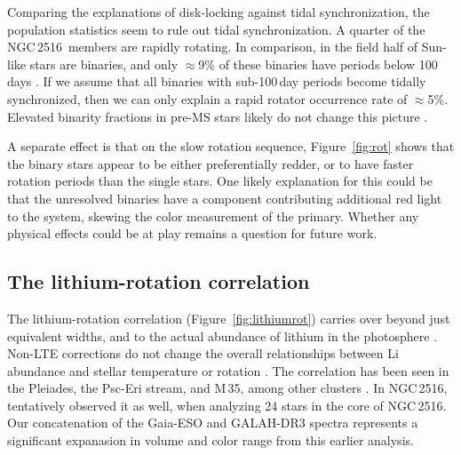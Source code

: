 \documentclass[12pt,twocolumn,tighten]{aastex63}
\newcommand{\cn}{NGC\,2516} %
\begin{document}
Comparing the explanations of disk-locking against tidal
synchronization, the population statistics seem to rule out 
tidal synchronization.  A quarter of the \cn\ members
are rapidly rotating.  In comparison, in the field half of Sun-like
stars are binaries, and only $\approx$9\% of these binaries have
periods below 100\,days \citep{raghavan_survey_2010}.  If we assume
that all binaries with sub-100\,day periods become tidally
synchronized, then we can only explain a rapid rotator occurrence rate
of $\approx$5\%.  Elevated binarity fractions in pre-MS stars likely
do not change this picture \citep[see Section~4.4
of][]{duchene_stellar_2013}.

A separate effect is that on the slow rotation sequence,
Figure~\ref{fig:rot} shows that the binary stars appear to be either
preferentially redder, or to have faster rotation periods than the
single stars.  One likely explanation for this could be that the
unresolved binaries have a component contributing additional red light
to the system, skewing the color measurement of the primary.  Whether
any physical effects could be at play remains a question for future
work.


\subsection{The lithium-rotation correlation}
\label{discussion:lithium}

The lithium-rotation correlation (Figure~\ref{fig:lithiumrot}) carries
over beyond just equivalent widths, and to the actual abundance of
lithium in the photosphere \citep{soderblom_evolution_1993}.  Non-LTE
corrections do not change the overall relationships between Li
abundance and stellar temperature or rotation
\citep{carlsson_1994,lind_departures_2009}.  The correlation has been
seen in the Pleiades, the Psc-Eri stream, and M\,35, among other
clusters
\citep{bouvier_pleiades_lirot_2018,arancibia_2020,jeffries_m35_li_2020,hawkins_2020}.
In \cn, \citet{jeffries_rotation_1998} tentatively observed it as
well, when analyzing 24 stars in the core of \cn.  Our concatenation
of the Gaia-ESO and GALAH-DR3 spectra represents a significant
expanasion in volume and color range from this earlier analysis.
\end{document}
